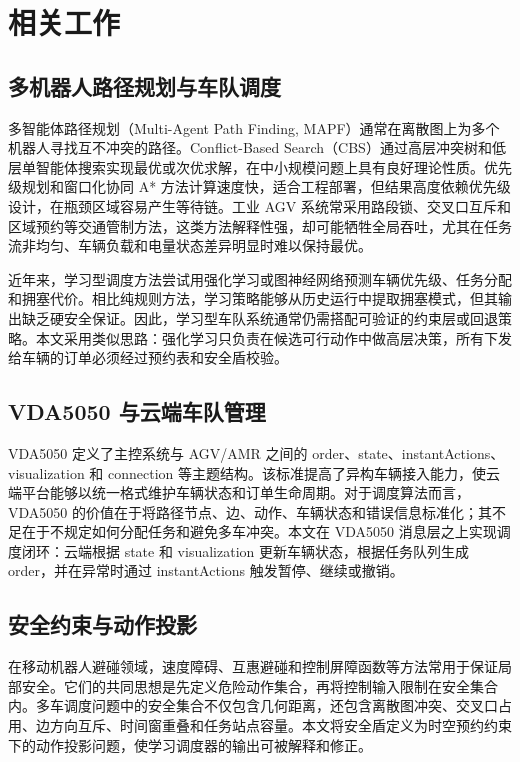 \documentclass[UTF8,twocolumn,11pt]{ctexart}
\begin{document}
\section{相关工作}

\subsection{多机器人路径规划与车队调度}

多智能体路径规划（Multi-Agent Path Finding, MAPF）通常在离散图上为多个机器人寻找互不冲突的路径。Conflict-Based Search（CBS）通过高层冲突树和低层单智能体搜索实现最优或次优求解，在中小规模问题上具有良好理论性质。优先级规划和窗口化协同 A* 方法计算速度快，适合工程部署，但结果高度依赖优先级设计，在瓶颈区域容易产生等待链。工业 AGV 系统常采用路段锁、交叉口互斥和区域预约等交通管制方法，这类方法解释性强，却可能牺牲全局吞吐，尤其在任务流非均匀、车辆负载和电量状态差异明显时难以保持最优。

近年来，学习型调度方法尝试用强化学习或图神经网络预测车辆优先级、任务分配和拥塞代价。相比纯规则方法，学习策略能够从历史运行中提取拥塞模式，但其输出缺乏硬安全保证。因此，学习型车队系统通常仍需搭配可验证的约束层或回退策略。本文采用类似思路：强化学习只负责在候选可行动作中做高层决策，所有下发给车辆的订单必须经过预约表和安全盾校验。

\subsection{VDA5050 与云端车队管理}

VDA5050 定义了主控系统与 AGV/AMR 之间的 order、state、instantActions、visualization 和 connection 等主题结构。该标准提高了异构车辆接入能力，使云端平台能够以统一格式维护车辆状态和订单生命周期。对于调度算法而言，VDA5050 的价值在于将路径节点、边、动作、车辆状态和错误信息标准化；其不足在于不规定如何分配任务和避免多车冲突。本文在 VDA5050 消息层之上实现调度闭环：云端根据 state 和 visualization 更新车辆状态，根据任务队列生成 order，并在异常时通过 instantActions 触发暂停、继续或撤销。

\subsection{安全约束与动作投影}

在移动机器人避碰领域，速度障碍、互惠避碰和控制屏障函数等方法常用于保证局部安全。它们的共同思想是先定义危险动作集合，再将控制输入限制在安全集合内。多车调度问题中的安全集合不仅包含几何距离，还包含离散图冲突、交叉口占用、边方向互斥、时间窗重叠和任务站点容量。本文将安全盾定义为时空预约约束下的动作投影问题，使学习调度器的输出可被解释和修正。
\end{document}

